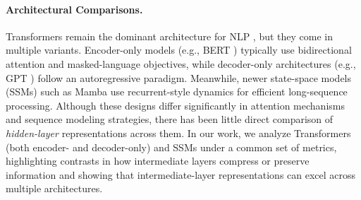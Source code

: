 

\paragraph{Architectural Comparisons.}

Transformers remain the dominant architecture for NLP \citep{vaswani2017attention}, but they come in multiple variants. Encoder-only models (e.g., BERT \citep{devlin2018bert}) typically use bidirectional attention and masked-language objectives, while decoder-only architectures (e.g., GPT \citep{gpt3}) follow an autoregressive paradigm. Meanwhile, newer state-space models (SSMs) such as Mamba \citep{mamba} use recurrent-style dynamics for efficient long-sequence processing. Although these designs differ significantly in attention mechanisms and sequence modeling strategies, there has been little direct comparison of \emph{hidden-layer} representations across them. In our work, we analyze Transformers (both encoder- and decoder-only) and SSMs under a common set of metrics, highlighting contrasts in how intermediate layers compress or preserve information and showing that intermediate-layer representations can excel across multiple architectures.







